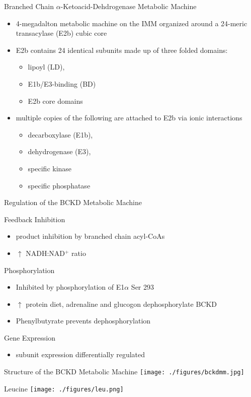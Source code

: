 \documentclass[presentation, smaller]{beamer}
\begin{document}
\begin{frame}[label={sec:orgheadline9}]{Branched Chain \(\alpha\)-Ketoacid-Dehdrogenase Metabolic Machine}
\begin{itemize}
\item 4-megadalton metabolic machine on the IMM organized around a 24-meric
transacylase (E2b) cubic core
\item E2b contains 24 identical subunits made up of three folded domains:
\begin{itemize}
\item lipoyl (LD),
\item E1b/E3-binding (BD)
\item E2b core domains
\end{itemize}
\item multiple copies of the following are attached to E2b via ionic interactions
\begin{itemize}
\item decarboxylase (E1b),
\item dehydrogenase (E3),
\item specific kinase
\item specific phosphatase
\end{itemize}
\end{itemize}
\end{frame}

\begin{frame}[label={sec:orgheadline10}]{Regulation of the BCKD Metabolic Machine}
\begin{block}{Feedback Inhibition}
\begin{itemize}
\item product inhibition by branched chain acyl-CoAs
\item \(\uparrow\) NADH:NAD\(^{\text{+}}\) ratio
\end{itemize}
\end{block}
\begin{block}{Phosphorylation}
\begin{itemize}
\item Inhibited by phosphorylation of E1\(\alpha\) Ser 293
\item \(\uparrow\) protein diet, adrenaline and glucogon dephosphorylate BCKD
\item Phenylbutyrate prevents dephosphorylation
\end{itemize}
\end{block}
\begin{block}{Gene Expression}
\begin{itemize}
\item subunit expression differentially regulated
\end{itemize}
\end{block}
\end{frame}

\begin{frame}[label={sec:orgheadline11}]{Structure of the BCKD Metabolic Machine}
\centering
\texttt{[image: ./figures/bckdmm.jpg]}
\end{frame}

\begin{frame}[label={sec:orgheadline12}]{Leucine}
\centering
\texttt{[image: ./figures/leu.png]}
\end{frame}
\end{document}
